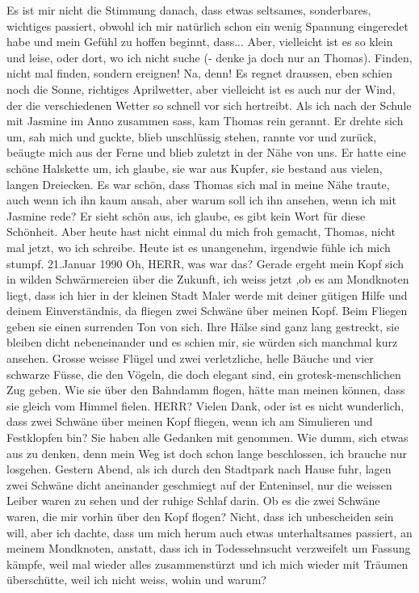 Es ist mir nicht die Stimmung danach, dass etwas seltsames, sonderbares, wichtiges passiert, obwohl ich mir natürlich schon ein wenig Spannung eingeredet habe und mein Gefühl zu hoffen beginnt, dass...
Aber, vielleicht ist es so klein und leise, oder dort, wo ich nicht suche (- denke ja doch nur an Thomas). Finden, nicht mal finden, sondern ereignen! Na, denn!
Es regnet draussen, eben schien noch die Sonne, richtiges Aprilwetter, aber vielleicht ist es auch nur der Wind, der die verschiedenen Wetter so schnell vor sich hertreibt.
Als ich nach der Schule mit Jasmine im Anno zusammen sass, kam Thomas rein gerannt. Er drehte sich um, sah mich und guckte, blieb unschlüssig stehen, rannte vor und zurück, beäugte mich aus der Ferne und blieb zuletzt in der Nähe von uns. Er hatte eine schöne Halskette um, ich glaube, sie war aus Kupfer, sie bestand aus vielen, langen Dreiecken.
Es war schön, dass Thomas sich mal in meine Nähe traute, auch wenn ich ihn kaum ansah, aber warum soll ich ihn ansehen, wenn ich mit Jasmine rede? Er sieht schön aus, ich glaube, es gibt kein Wort für diese Schönheit.
Aber heute hast nicht einmal du mich froh gemacht, Thomas, nicht mal jetzt, wo ich schreibe. Heute ist es unangenehm, irgendwie fühle ich mich stumpf.
21.Januar 1990
Oh, HERR, was war das?
Gerade ergeht mein Kopf sich in wilden Schwärmereien über die Zukunft, ich weiss jetzt ,ob es am Mondknoten liegt, dass ich hier in der kleinen Stadt Maler werde mit deiner gütigen Hilfe und deinem Einverständnis, da fliegen zwei Schwäne über meinen Kopf.
Beim Fliegen geben sie einen surrenden Ton von sich. Ihre Hälse sind ganz lang gestreckt, sie bleiben dicht nebeneinander und es schien mir, sie würden sich manchmal kurz ansehen. Grosse weisse Flügel und zwei verletzliche, helle Bäuche und vier schwarze Füsse, die den Vögeln, die doch elegant sind, ein grotesk-menschlichen Zug geben. Wie sie über den Bahndamm flogen, hätte man meinen können, dass sie gleich vom Himmel fielen.
HERR? Vielen Dank, oder ist es nicht wunderlich, dass zwei Schwäne über meinen Kopf fliegen, wenn ich am Simulieren und Festklopfen bin? Sie haben alle Gedanken mit genommen. Wie dumm, sich etwas aus zu denken, denn mein Weg ist doch schon lange beschlossen, ich brauche nur losgehen.
Gestern Abend, als ich durch den Stadtpark nach Hause fuhr, lagen zwei Schwäne dicht aneinander geschmiegt auf der Enteninsel, nur die weissen Leiber waren zu sehen und der ruhige Schlaf darin. Ob es die zwei Schwäne waren, die mir vorhin über den Kopf flogen?
Nicht, dass ich unbescheiden sein will, aber ich dachte, dass um mich herum auch etwas  unterhaltsames passiert, an meinem Mondknoten, anstatt, dass ich in Todessehnsucht verzweifelt um Fassung kämpfe, weil mal wieder alles zusammenstürzt und ich mich wieder mit Träumen überschütte, weil ich nicht weiss, wohin und warum?
